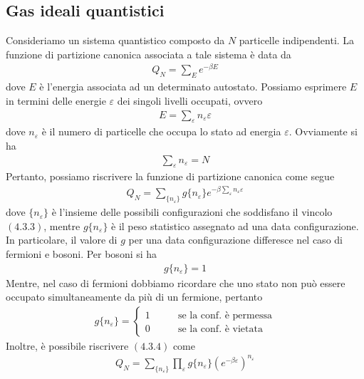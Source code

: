 \documentclass{article}
\begin{document}
\newpage
\subsection{Gas ideali quantistici}
Consideriamo un sistema quantistico composto da $N$ particelle indipendenti. La funzione di partizione canonica associata a tale sistema è data da
\begin{align}
    Q_N = \sum_E e^{-\beta E} \tag{4.3.1}
\end{align}
dove $E$ è l'energia associata ad un determinato autostato. Possiamo esprimere $E$ in termini delle energie $\varepsilon$ dei singoli livelli occupati, ovvero 
\begin{align}
    E = \sum_{\varepsilon} n_\varepsilon\varepsilon \tag{4.3.2}
\end{align}
dove $n_\varepsilon$ è il numero di particelle che occupa lo stato ad energia $\varepsilon$. Ovviamente si ha 
\begin{align}
    \sum_\varepsilon n_\varepsilon = N \tag{4.3.3}
\end{align}
Pertanto, possiamo riscrivere la funzione di partizione canonica come segue
\begin{align}
    Q_N = \sum_{\{n_\varepsilon\}} g\{n_\varepsilon\}e^{-\beta\sum_\varepsilon n_\varepsilon\varepsilon} \tag{4.3.4}
\end{align}
dove $\{n_\varepsilon\}$ è l'insieme delle possibili configurazioni che soddisfano il vincolo $(4.3.3)$, mentre $g\{n_\varepsilon\}$ è il peso statistico assegnato ad una data configurazione. In particolare, il valore di $g$ per una data configurazione differesce nel caso di fermioni e bosoni. Per bosoni si ha
\begin{align}
    g\{n_\varepsilon\} = 1 \tag{4.3.5}
\end{align}
Mentre, nel caso di fermioni dobbiamo ricordare che uno stato non può essere occupato simultaneamente da più di un fermione, pertanto
\begin{align}
    g\{n_\varepsilon\} = \begin{cases}
        1 \qquad &\text{se la conf. è permessa} \\
        0 \qquad &\text{se la conf. è vietata}
    \end{cases} \tag{4.3.6}
\end{align}
Inoltre, è possibile riscrivere $(4.3.4)$ come 
\begin{align}
    Q_N = \sum_{\{n_\varepsilon\}}\prod_\varepsilon g\{n_\varepsilon\}\left(e^{-\beta\varepsilon}\right)^{n_\varepsilon} \tag{4.3.7}
\end{align}
\end{document}
